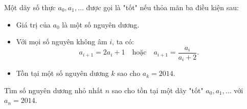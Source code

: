 \ifshowproblem
\begin{problem}\label{example:APMO-2015-P3}
    Một dãy số thực \( a_0, a_1, \ldots \) được gọi là "tốt" nếu thỏa mãn ba điều kiện sau:
    \begin{itemize}[topsep=0pt, partopsep=0pt, itemsep=0pt]
        \item Giá trị của \( a_0 \) là một số nguyên dương.
        \item Với mọi số nguyên không âm \( i \), ta có:
        \[
            a_{i+1} = 2a_i + 1 \quad \text{hoặc} \quad a_{i+1} = \frac{a_i}{a_i + 2}.
        \]
        \item Tồn tại một số nguyên dương \( k \) sao cho \( a_k = 2014 \).
    \end{itemize}

    Tìm số nguyên dương nhỏ nhất \( n \) sao cho tồn tại một dãy "tốt" \( a_0, a_1, \ldots \) với \( a_n = 2014 \).
\end{problem}
\fi

\footnotemark
{}
\fi